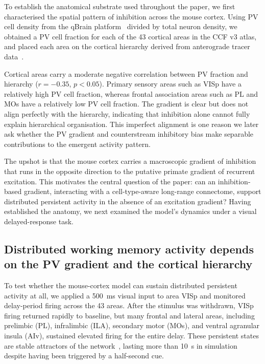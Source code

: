 \documentclass[11pt]{article}
\begin{document}
To establish the anatomical substrate used throughout the paper, we first characterised the spatial pattern of inhibition across the mouse cortex. Using PV cell density from the qBrain platform~\cite{kim2017braintype} divided by total neuron density, we obtained a PV cell fraction for each of the 43 cortical areas in the CCF v3 atlas, and placed each area on the cortical hierarchy derived from anterograde tracer data~\cite{oh2014mesoscale,harris2019hierarchical}.

Cortical areas carry a moderate negative correlation between PV fraction and hierarchy ($r=-0.35$, $p<0.05$). Primary sensory areas such as VISp have a relatively high PV cell fraction, whereas frontal association areas such as PL and MOs have a relatively low PV cell fraction. The gradient is clear but does not align perfectly with the hierarchy, indicating that inhibition alone cannot fully explain hierarchical organisation. This imperfect alignment is one reason we later ask whether the PV gradient and counterstream inhibitory bias make separable contributions to the emergent activity pattern.

The upshot is that the mouse cortex carries a macroscopic gradient of inhibition that runs in the opposite direction to the putative primate gradient of recurrent excitation. This motivates the central question of the paper: can an inhibition-based gradient, interacting with a cell-type-aware long-range connectome, support distributed persistent activity in the absence of an excitation gradient? Having established the anatomy, we next examined the model's dynamics under a visual delayed-response task.

\subsection{Distributed working memory activity depends on the PV gradient and the cortical hierarchy}

To test whether the mouse-cortex model can sustain distributed persistent activity at all, we applied a 500~ms visual input to area VISp and monitored delay-period firing across the 43 areas. After the stimulus was withdrawn, VISp firing returned rapidly to baseline, but many frontal and lateral areas, including prelimbic (PL), infralimbic (ILA), secondary motor (MOs), and ventral agranular insula (AIv), sustained elevated firing for the entire delay. These persistent states are stable attractors of the network~\cite{inagaki2019discrete}, lasting more than 10~s in simulation despite having been triggered by a half-second cue.
\end{document}
